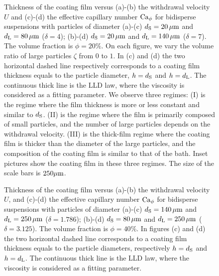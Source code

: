\documentclass{jfm}
\begin{document}
\begin{figure}
\centering
{}
  \caption{Thickness of the coating film versus (a)-(b) the withdrawal velocity $U$ and 
      (c)-(d) the effective capillary number ${\rm Ca}_\phi$ for bidisperse suspensions with
      particles of diameter
      (a)-(c) $d_{\rm S} = 20\,\mu{\rm m}$ and $d_{\rm L} = 80\,\mu{\rm m}$ ($\delta=4$); 
      (b)-(d) $d_{\rm S} = 20\,\mu{\rm m}$ and $d_{\rm L} = 140\,\mu{\rm m}$ ($\delta=7$).
      The volume fraction is $\phi = 20\%$.
      On each figure, we vary the volume ratio of large particles $\zeta$ from $0$ to $1$.
      In (c) and (d) the two horizontal dashed line respectively corresponds 
      to a coating film thickness equals to the particle diameter, $h=d_{\rm S}$ and $h=d_{\rm L}$.
      The continuous thick line is the LLD law, where the viscosity is considered as a fitting parameter.
      We observe three regimes:
      (I) is the regime where the film thickness is more or less constant and similar to $d_{\rm S}$.
      (II) is the regime where the film is primarily composed of small particles, 
      and the number of large particles depends on the withdrawal velocity.
      (III) is the thick-film regime where the coating film is thicker than the diameter of the large particles, and the composition of the coating film is similar to that of the bath. Inset pictures show the coating film in these three regimes. The size of the scale bars is $250 \mu\rm{m}$.
  }
  \label{fgr:Figure_6}
\end{figure}


\begin{figure}
\centering
{}
\caption{Thickness of the coating film versus (a)-(b) the withdrawal velocity $U$,
    and (c)-(d) the effective capillary number ${\rm Ca}_\phi$ for bidisperse suspensions with
    particles of diameter 
    (a)-(c) $d_{\rm S} = 140\,\mu{\rm m}$ and $d_{\rm L} = 250\,\mu{\rm m}$ ($\delta=1.786$);
    (b)-(d) $d_{\rm S} =  80\,\mu{\rm m}$ and $d_{\rm L} = 250\,\mu{\rm m}$ ($\delta=3.125$).
    The volume fraction is $\phi = 40\%$.
    In figures (c) and (d) the two horizontal dashed line corresponds to a coating film thickness
    equals to the particle diameters, respectively $h=d_{\rm S}$ and $h=d_{\rm L}$.
    The continuous thick line is the LLD law, where the viscosity is considered as a fitting parameter.
}
  \label{fgr:Figure_7}
\end{figure}
\end{document}
